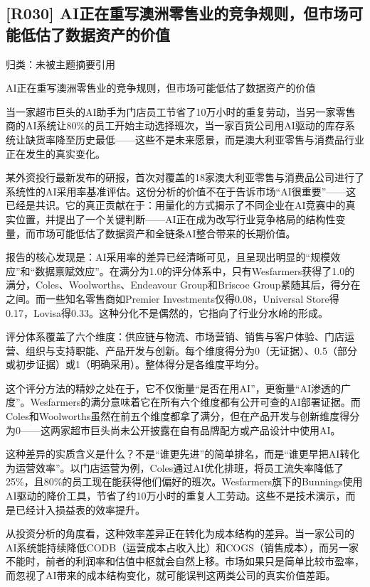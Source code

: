 \documentclass[11pt]{ctexart}
\begin{document}
\subsection{[R030] AI正在重写澳洲零售业的竞争规则，但市场可能低估了数据资产的价值}
{\small\color{refgray}归类：未被主题摘要引用}

AI正在重写澳洲零售业的竞争规则，但市场可能低估了数据资产的价值

当一家超市巨头的AI助手为门店员工节省了10万小时的重复劳动，当另一家零售商的AI系统让80\%的员工开始主动选择班次，当一家百货公司用AI驱动的库存系统让缺货率降至历史最低——这些不是未来愿景，而是澳大利亚零售与消费品行业正在发生的真实变化。

某外资投行最新发布的研报，首次对覆盖的18家澳大利亚零售与消费品公司进行了系统性的AI采用率基准评估。这份分析的价值不在于告诉市场“AI很重要”——这已经是共识。它的真正贡献在于：用量化的方式揭示了不同企业在AI竞赛中的真实位置，并提出了一个关键判断——AI正在成为改写行业竞争格局的结构性变量，而市场可能低估了数据资产和全链条AI整合带来的长期价值。

报告的核心发现是：AI采用率的差异已经清晰可见，且呈现出明显的“规模效应”和“数据禀赋效应”。在满分为1.0的评分体系中，只有Wesfarmers获得了1.0的满分，Coles、Woolworths、Endeavour Group和Briscoe Group紧随其后，得分在 之间。而一些知名零售商如Premier Investments仅得0.08，Universal Store得0.17，Lovisa得0.33。这种分化不是偶然的，它指向了行业分水岭的形成。

评分体系覆盖了六个维度：供应链与物流、市场营销、销售与客户体验、门店运营、组织与支持职能、产品开发与创新。每个维度得分为0（无证据）、0.5（部分或初步证据）或1（明确采用）。整体得分是各维度平均分。

这个评分方法的精妙之处在于，它不仅衡量“是否在用AI”，更衡量“AI渗透的广度”。Wesfarmers的满分意味着它在所有六个维度都有公开可查的AI部署证据。而Coles和Woolworths虽然在前五个维度都拿了满分，但在产品开发与创新维度得分为0——这两家超市巨头尚未公开披露在自有品牌配方或产品设计中使用AI。

这种差异的实质含义是什么？不是“谁更先进”的简单排名，而是“谁更早把AI转化为运营效率”。以门店运营为例，Coles通过AI优化排班，将员工流失率降低了25\%，且80\%的员工现在能获得他们偏好的班次。Wesfarmers旗下的Bunnings使用AI驱动的降价工具，节省了约10万小时的重复人工劳动。这些不是技术演示，而是已经计入损益表的效率提升。

从投资分析的角度看，这种效率差异正在转化为成本结构的差异。当一家公司的AI系统能持续降低CODB（运营成本占收入比）和COGS（销售成本），而另一家不能时，前者的利润率和估值中枢就会自然上移。市场如果只是简单比较市盈率，而忽视了AI带来的成本结构变化，就可能误判这两类公司的真实价值差距。
\end{document}
